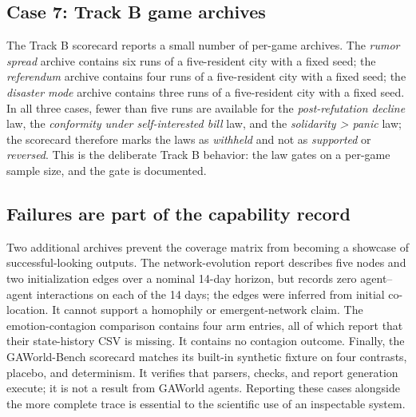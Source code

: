 \subsection{Case 7: Track B game archives}

The Track B scorecard reports a small number of per-game archives.  The
\emph{rumor spread} archive contains six runs of a five-resident city
with a fixed seed; the \emph{referendum} archive contains four runs of
a five-resident city with a fixed seed; the \emph{disaster mode}
archive contains three runs of a five-resident city with a fixed seed.
In all three cases, fewer than five runs are available for the
\emph{post-refutation decline} law, the \emph{conformity under
self-interested bill} law, and the \emph{solidarity > panic} law; the
scorecard therefore marks the laws as \emph{withheld} and not as
\emph{supported} or \emph{reversed}.  This is the deliberate Track B
behavior: the law gates on a per-game sample size, and the gate is
documented.

\subsection{Failures are part of the capability record}

Two additional archives prevent the coverage matrix from becoming a
showcase of successful-looking outputs.  The network-evolution report
describes five nodes and two initialization edges over a nominal
14-day horizon, but records zero agent--agent interactions on each of
the 14 days; the edges were inferred from initial co-location.  It
cannot support a homophily or emergent-network claim.  The
emotion-contagion comparison contains four arm entries, all of which
report that their state-history CSV is missing.  It contains no
contagion outcome.  Finally, the GAWorld-Bench scorecard matches its
built-in synthetic fixture on four contrasts, placebo, and
determinism.  It verifies that parsers, checks, and report generation
execute; it is not a result from GAWorld agents.  Reporting these cases
alongside the more complete trace is essential to the scientific use of
an inspectable system.
